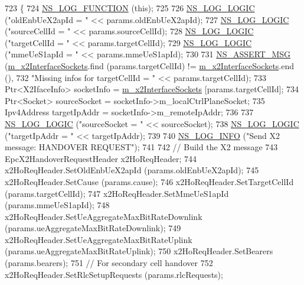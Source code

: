 \begin{DoxyCode}
723 \{
724   \hyperlink{log-macros-disabled_8h_a90b90d5bad1f39cb1b64923ea94c0761}{NS\_LOG\_FUNCTION} (\textcolor{keyword}{this});
725 
726   \hyperlink{group__logging_ga88acd260151caf2db9c0fc84997f45ce}{NS\_LOG\_LOGIC} (\textcolor{stringliteral}{"oldEnbUeX2apId = "} << params.oldEnbUeX2apId);
727   \hyperlink{group__logging_ga88acd260151caf2db9c0fc84997f45ce}{NS\_LOG\_LOGIC} (\textcolor{stringliteral}{"sourceCellId = "} << params.sourceCellId);
728   \hyperlink{group__logging_ga88acd260151caf2db9c0fc84997f45ce}{NS\_LOG\_LOGIC} (\textcolor{stringliteral}{"targetCellId = "} << params.targetCellId);
729   \hyperlink{group__logging_ga88acd260151caf2db9c0fc84997f45ce}{NS\_LOG\_LOGIC} (\textcolor{stringliteral}{"mmeUeS1apId  = "} << params.mmeUeS1apId);
730 
731   \hyperlink{assert_8h_aff5ece9066c74e681e74999856f08539}{NS\_ASSERT\_MSG} (\hyperlink{classns3_1_1EpcX2_a0665276228b9b99a52ef6d5e9bdb306d}{m\_x2InterfaceSockets}.find (params.targetCellId) != 
      \hyperlink{classns3_1_1EpcX2_a0665276228b9b99a52ef6d5e9bdb306d}{m\_x2InterfaceSockets}.end (),
732                  \textcolor{stringliteral}{"Missing infos for targetCellId = "} << params.targetCellId);
733   Ptr<X2IfaceInfo> socketInfo = \hyperlink{classns3_1_1EpcX2_a0665276228b9b99a52ef6d5e9bdb306d}{m\_x2InterfaceSockets} [params.targetCellId];
734   Ptr<Socket> sourceSocket = socketInfo->m\_localCtrlPlaneSocket;
735   Ipv4Address targetIpAddr = socketInfo->m\_remoteIpAddr;
736 
737   \hyperlink{group__logging_ga88acd260151caf2db9c0fc84997f45ce}{NS\_LOG\_LOGIC} (\textcolor{stringliteral}{"sourceSocket = "} << sourceSocket);
738   \hyperlink{group__logging_ga88acd260151caf2db9c0fc84997f45ce}{NS\_LOG\_LOGIC} (\textcolor{stringliteral}{"targetIpAddr = "} << targetIpAddr);
739 
740   \hyperlink{group__logging_gafbd73ee2cf9f26b319f49086d8e860fb}{NS\_LOG\_INFO} (\textcolor{stringliteral}{"Send X2 message: HANDOVER REQUEST"});
741 
742   \textcolor{comment}{// Build the X2 message}
743   EpcX2HandoverRequestHeader x2HoReqHeader;
744   x2HoReqHeader.SetOldEnbUeX2apId (params.oldEnbUeX2apId);
745   x2HoReqHeader.SetCause (params.cause);
746   x2HoReqHeader.SetTargetCellId (params.targetCellId);
747   x2HoReqHeader.SetMmeUeS1apId (params.mmeUeS1apId);
748   x2HoReqHeader.SetUeAggregateMaxBitRateDownlink (params.ueAggregateMaxBitRateDownlink);
749   x2HoReqHeader.SetUeAggregateMaxBitRateUplink (params.ueAggregateMaxBitRateUplink);
750   x2HoReqHeader.SetBearers (params.bearers);
751   \textcolor{comment}{// For secondary cell handover}
752   x2HoReqHeader.SetRlcSetupRequests (params.rlcRequests);

\end{DoxyCode}
